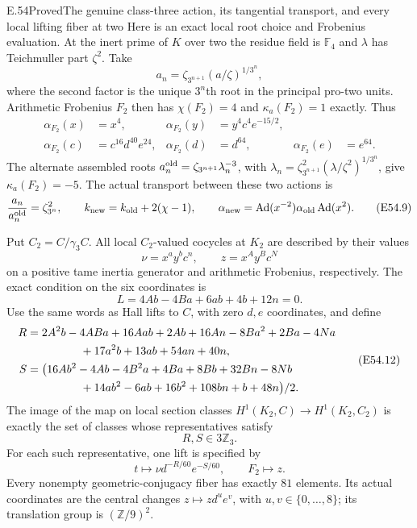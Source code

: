 \begin{statement}{E.54}{Proved}{The genuine class-three action, its tangential transport, and every local lifting fiber at two}
Here is an exact local root choice and Frobenius evaluation.
At the inert prime of $K$ over two the residue field is
$\mathbb F_4$ and $\lambda$ has Teichmuller part $\zeta^2$.
Take
\[
 a_n=\zeta_{3^{n+1}}(a/\zeta)^{1/3^n},
 \tag{E54.7}
\]
where the second factor is the unique $3^n$th root in the
principal pro-two units. Arithmetic Frobenius $F_2$ then has
$\chi(F_2)=4$ and $\kappa_a(F_2)=1$ exactly. Thus
\[
 \begin{aligned}
 \alpha_{F_2}(x)&=x^4,&
 \alpha_{F_2}(y)&=y^4c^4e^{-15/2},\\
 \alpha_{F_2}(c)&=c^{16}d^{40}e^{24},&
 \alpha_{F_2}(d)&=d^{64},&
 \alpha_{F_2}(e)&=e^{64}.
 \end{aligned}
 \tag{E54.8}
\]
The alternate assembled roots
$a_n^{\rm old}=\zeta_{3^{n+1}}\lambda_n^{-3}$, with
$\lambda_n=\zeta_{3^{n+1}}^2
(\lambda/\zeta^2)^{1/3^n}$, give $\kappa_a(F_2)=-5$.
The actual transport between these two actions is
\[
 \frac{a_n}{a_n^{\rm old}}=\zeta_{3^n}^2,\qquad
 k_{\rm new}=k_{\rm old}+2(\chi-1),\qquad
 \alpha_{\rm new}
 =\operatorname{Ad}(x^{-2})\alpha_{\rm old}
                  \operatorname{Ad}(x^2).
 \tag{E54.9}
\]

Put $C_2=C/\gamma_3C$. All local $C_2$-valued cocycles at
$K_2$ are described by their values
\[
 \nu=x^a y^b c^n,\qquad z=x^A y^B c^N
 \tag{E54.10}
\]
on a positive tame inertia generator and arithmetic Frobenius,
respectively. The exact condition on the six coordinates is
\[
 L=4Ab-4Ba+6ab+4b+12n=0.
 \tag{E54.11}
\]
Use the same words as Hall lifts to $C$, with zero $d,e$
coordinates, and define
\[
 \begin{split}
 R={}&2A^2b-4ABa+16Aab+2Ab+16An
          -8Ba^2+2Ba-4Na\\
       &\hspace{12mm}+17a^2b+13ab+54an+40n,\\
 S={}&\bigl(16Ab^2-4Ab-4B^2a+4Ba+8Bb+32Bn-8Nb\\
       &\hspace{12mm}+14ab^2-6ab+16b^2+108bn+b+48n\bigr)/2 .
 \end{split}
 \tag{E54.12}
\]
The image of the map on local section classes
$H^1(K_2,C)\to H^1(K_2,C_2)$ is exactly the set of classes
whose representatives satisfy
\[
                 R,S\in3\mathbb Z_3.
 \tag{E54.13}
\]
For each such representative, one lift is specified by
\[
       t\longmapsto \nu d^{-R/60}e^{-S/60},\qquad
       F_2\longmapsto z.
 \tag{E54.14}
\]
Every nonempty geometric-conjugacy fiber has exactly $81$
elements. Its actual coordinates are the central changes
$z\mapsto zd^u e^v$, with $u,v\in\{0,\ldots,8\}$; its
translation group is $(\mathbb Z/9)^2$.


\end{statement}
